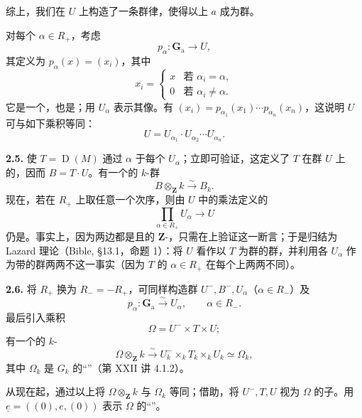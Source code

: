 综上，我们在 $U$ 上构造了一条群律，使得以上 $a$ 成为群。

对每个 $\alpha\in R_+$，考虑
\[p_\alpha:\mathbf G_{\mathrm a}\longrightarrow U,\]
其定义为 $p_\alpha(x)=(x_i)$，其中
\[x_i=\begin{cases}x&\text{若 }\alpha_i=\alpha,\\0&\text{若 }\alpha_i\ne\alpha.\end{cases}\]
它是一个，也是；用 $U_\alpha$ 表示其像。有 $(x_i)=p_{\alpha_1}(x_1)\cdots p_{\alpha_n}(x_n)$，这说明 $U$ 可与如下乘积等同：
\[U=U_{\alpha_1}\cdot U_{\alpha_2}\cdots U_{\alpha_n}.\]

\textbf{2.5.} 使 $T=\operatorname D(M)$ 通过 $\alpha$ 于每个 $U_\alpha$；立即可验证，这定义了 $T$ 在群 $U$ 上的，因而 $B=T\cdot U$。有一个的 $k$-群
\[B\otimes_{\mathbf Z}k\xrightarrow{\sim}B_k.\]
现在，若在 $R_+$ 上取任意一个次序，则由 $U$ 中的乘法定义的
\[\prod_{\alpha\in R_+}U_\alpha\longrightarrow U\]
仍是。事实上，因为两边都是且的 $\mathbf Z$-，只需在上验证这一断言；于是归结为 Lazard 理论（Bible, \S 13.1，命题 1）：将 $U$ 看作以 $T$ 为群的群，并利用各 $U_\alpha$ 作为带的群两两不这一事实（因为 $T$ 的 $\alpha\in R_+$ 在每个上两两不同）。

\textbf{2.6.} 将 $R_+$ 换为 $R_-=-R_+$，可同样构造群 $U^-,B^-,U_\alpha$（$\alpha\in R_-$）及
\[p_\alpha:\mathbf G_{\mathrm a}\xrightarrow{\sim}U_\alpha,\qquad\alpha\in R_-.\]
最后引入乘积
\[\Omega=U^-\times T\times U;\]
有一个的 $k$-
\[\Omega\otimes_{\mathbf Z}k\xrightarrow{\sim}U_k^-\times_kT_k\times_kU_k\simeq\Omega_k,\]
其中 $\Omega_k$ 是 $G_k$ 的“”（第 XXII 讲 4.1.2）。

从现在起，通过以上将 $\Omega\otimes_{\mathbf Z}k$ 与 $\Omega_k$ 等同；借助，将 $U^-,T,U$ 视为 $\Omega$ 的子。用 $\underline e=((0),e,(0))$ 表示 $\Omega$ 的“”。


